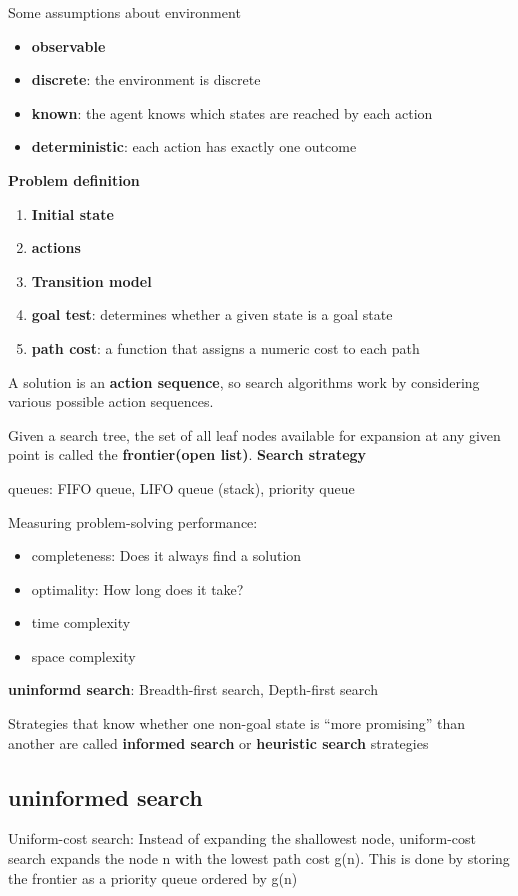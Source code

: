 \documentclass[11pt]{article}
\begin{document}
Some assumptions about environment
\begin{itemize}
\item \textbf{observable}
\item \textbf{discrete}: the environment is discrete
\item \textbf{known}: the agent knows which states are reached by each action
\item \textbf{deterministic}: each action has exactly one outcome
\end{itemize}


\textbf{Problem definition}
\begin{enumerate}
\item \textbf{Initial state}
\item \textbf{actions}
\item \textbf{Transition model}
\item \textbf{goal test}: determines whether a given state is a goal state
\item \textbf{path cost}: a function that assigns a numeric cost to each path
\end{enumerate}


A solution is an \textbf{action sequence}, so search algorithms work
by considering various possible action sequences.


Given a search tree, the set of all leaf nodes available for expansion at any
given point is called the \textbf{frontier(open list)}. \textbf{Search strategy}


queues: FIFO queue, LIFO queue (stack), priority queue


Measuring problem-solving performance: 
\begin{itemize}
\item completeness: Does it always find a solution
\item optimality: How long does it take?
\item time complexity
\item space complexity
\end{itemize}


\textbf{uninformd search}: Breadth-first search, Depth-first search


Strategies that know whether one non-goal state is “more promising” than
another are called \textbf{informed search} or \textbf{heuristic search} strategies

\subsection{uninformed search}
\label{sec:orgd5fc216}
Uniform-cost search: Instead of expanding the shallowest node, uniform-cost
search expands the node n with the lowest path cost g(n). This is done by
storing the frontier as a priority queue ordered by g(n)
\end{document}
